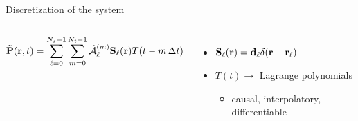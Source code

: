 \documentclass[aspectratio=169]{beamer}
\begin{document}
\begin{frame}{Discretization of the system}
  \begin{columns}[T]
      \centering
      

      \begin{block}{}
        \begin{equation*}
          \tilde{\vb{P}}(\vb{r}, t) = \sum_{\ell = 0}^{N_s - 1} \sum_{m = 0}^{N_t - 1} \tilde{\mathcal{A}}_\ell^{(m)}\vb{S}_\ell(\vb{r}) T(t - m \, \Delta t)
        \end{equation*}
      \end{block}
      \begin{itemize}
        \item $\vb{S}_\ell(\vb{r}) = \vb{d}_\ell \delta(\vb{r} - \vb{r}_\ell)$
        \item $T(t) \rightarrow$ Lagrange polynomials
          \begin{itemize}
            \item causal, interpolatory, differentiable
          \end{itemize}
      \end{itemize}
  \end{columns}
\end{frame}
\end{document}
